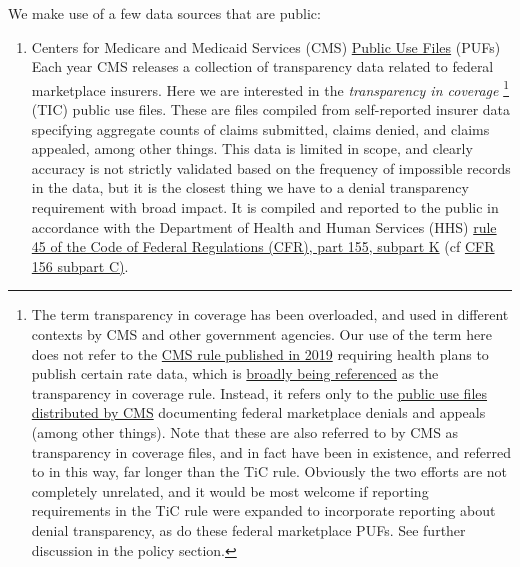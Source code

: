 \documentclass[12pt, a4paper]{report}
\begin{document}
We make use of a few data sources that are public:\\

\begin{enumerate}
	\item Centers for Medicare and Medicaid Services (CMS) \href{https://www.cms.gov/cciio/resources/data-resources/marketplace-puf}{Public Use Files} (PUFs)\\
	
	Each year CMS releases a collection of transparency data related to federal marketplace insurers. Here we are interested in the \emph{transparency in coverage} \footnote{The term transparency in coverage has been overloaded, and used in different contexts by CMS and other government agencies. Our use of the term here does not refer to the \href{https://www.federalregister.gov/documents/2019/11/27/2019-25011/transparency-in-coverage}{CMS rule published in 2019} requiring health plans to publish certain rate data, which is \href{https://www.cms.gov/healthplan-price-transparency}{broadly being referenced} as the transparency in coverage rule. Instead, it refers only to the \href{https://www.cms.gov/cciio/resources/data-resources/marketplace-puf}{public use files distributed by CMS} documenting federal marketplace denials and appeals (among other things). Note that these are also referred to by CMS as transparency in coverage files, and in fact have been in existence, and referred to in this way, far longer than the TiC rule. Obviously the two efforts are not completely unrelated, and it would be most welcome if reporting requirements in the TiC rule were expanded to incorporate reporting about denial transparency, as do these federal marketplace PUFs. See further discussion in the policy section.} (TIC) public use files. These are files compiled from self-reported insurer data specifying aggregate counts of claims submitted, claims denied, and claims appealed, among other things. This data is limited in scope, and clearly accuracy is not strictly validated based on the frequency of impossible records in the data, but it is the closest thing we have to a denial transparency requirement with broad impact. It is compiled and reported to the public in accordance with the Department of Health and Human Services (HHS) \href{https://www.ecfr.gov/current/title-45/subtitle-A/subchapter-B/part-155/subpart-K/section-155.1040}{rule 45 of the Code of Federal Regulations (CFR), part 155, subpart K} (cf \href{https://www.ecfr.gov/current/title-45/subtitle-A/subchapter-B/part-156/subpart-C/section-156.220}{CFR 156 subpart C)}.\\
	

\end{enumerate}
\end{document}
